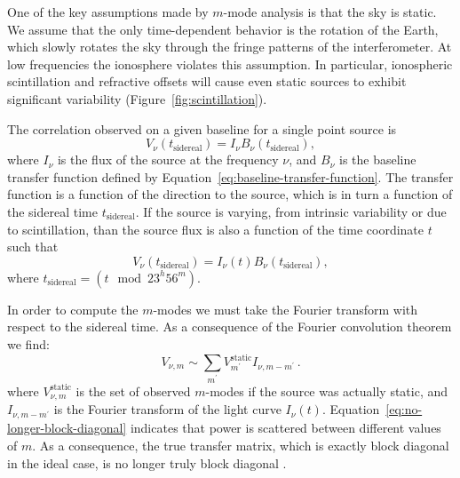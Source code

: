 \documentclass[twocolumn]{aastex61}
\begin{document}
One of the key assumptions made by $m$-mode analysis is that the sky is static.  We assume that the
only time-dependent behavior is the rotation of the Earth, which slowly rotates the sky through the
fringe patterns of the interferometer. At low frequencies the ionosphere violates this assumption.
In particular, ionospheric scintillation and refractive offsets will cause even static sources to
exhibit significant variability (Figure~\ref{fig:scintillation}).

The correlation observed on a given baseline for a single point source is
\begin{equation}
    V_\nu(t_{\textrm{sidereal}}) = I_\nu B_\nu(t_{\textrm{sidereal}}),
\end{equation}
where $I_\nu$ is the flux of the source at the frequency $\nu$, and $B_\nu$ is the baseline transfer
function defined by Equation~\ref{eq:baseline-transfer-function}. The transfer function is a
function of the direction to the source, which is in turn a function of the sidereal time
$t_{\textrm{sidereal}}$. If the source is varying, from intrinsic variability or due to
scintillation, than the source flux is also a function of the time coordinate $t$ such that
\begin{equation}
    V_\nu(t_{\textrm{sidereal}}) = I_\nu(t) B_\nu(t_{\textrm{sidereal}}),
\end{equation}
where $t_{\textrm{sidereal}} = (t \mod 23^h56^m)$.

In order to compute the $m$-modes we must take the Fourier transform with respect to the sidereal
time. As a consequence of the Fourier convolution theorem we find:
\begin{equation}\label{eq:no-longer-block-diagonal}
    V_{\nu, m} \sim \sum_{m^\prime} V_{m^\prime}^\textrm{static} I_{\nu, m-m^\prime}\,.
\end{equation}
where $V_{\nu, m}^{\textrm{static}}$ is the set of observed $m$-modes if the source was actually
static, and $I_{\nu, m-m^\prime}$ is the Fourier transform of the light curve $I_{\nu}(t)$.
Equation~\ref{eq:no-longer-block-diagonal} indicates that power is scattered between different
values of $m$. As a consequence, the true transfer matrix, which is exactly block diagonal in the
ideal case, is no longer truly block diagonal \citep{richard_ionosphere_thoughts}.
\end{document}
